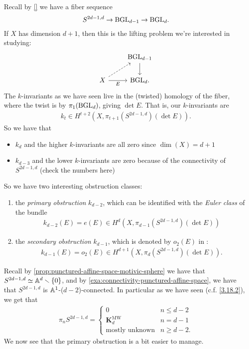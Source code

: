\documentclass[11pt,openany]{book}
\providecommand{\KMW}{\mathbf{K}^\mathrm{MW}}
\begin{document}
Recall by \autoref{} we have a fiber sequence
\begin{align*}
    S^{2d-1,d} \to \mathrm{BGL}_{d-1} \to \mathrm{BGL}_d.
\end{align*}
If $X$ has dimension $d+1$, then this is the lifting problem we're interested in studying:
\[ \begin{tikzcd}
     & \BGL_{d-1}\dar\\
    X\rar["E" below]\ar[ur,dashed] & \BGL_d.
\end{tikzcd} \]
%
The $k$-invariants as we have seen live in the (twisted) homology of the fiber, where the twist is by $\pi_1(\mathrm{BGL}_d)$, giving $\det E$. That is, our $k$-invariants are
\begin{align*}
    k_t \in H^{t+2}(X,\pi_{t+1}(S^{2d-1,d})(\det E)).
\end{align*}
%
So we have that
\begin{itemize}
    \item $k_d$ and the higher $k$-invariants are all zero since $\dim(X) = d+1$
    \item $k_{d-3}$ and the lower $k$-invariants are zero because of the connectivity of $S^{2d-1,d}$ (\todo check the numbers here)
\end{itemize}
So we have two interesting obstruction classes:
\begin{enumerate}
    \item the \textit{primary obstruction} $k_{d-2}$, which can be identified with the \textit{Euler class} of the bundle
    \begin{align*}
        k_{d-2}(E) = e(E) \in H^d(X,\pi_{d-1}(S^{2d-1,d})(\det E))
    \end{align*}
    \item the \textit{secondary obstruction} $k_{d-1}$, which is denoted by $o_2(E)$ in \cite{Freudenthal}:
    \begin{align*}
        k_{d-1}(E) = o_2(E) \in H^{d+1}(X,\pi_{d}(S^{2d-1,d})(\det E)).
    \end{align*}
\end{enumerate}
Recall by \autoref{prop:punctured-affine-space-motivic-sphere} we have that $S^{2d-1,d}\simeq \mathbb{A}^d\smallsetminus\{0\}$, and by \autoref{exa:connectivity-punctured-affine-space}, we have that $S^{2d-1,d}$ is $\mathbb{A}^1$-($d-2$)-connected. In particular as we have seen (c.f. \autoref{3.18.2}), we get that
\begin{align*}
    \pi_n S^{2d-1,d} = \begin{cases} 0 & n\le d-2 \\ \KMW_d & n=d-1 \\ \text{mostly unknown} & n\ge d-2.\end{cases}
\end{align*}
We now see that the primary obstruction is a bit easier to manage.
\end{document}
